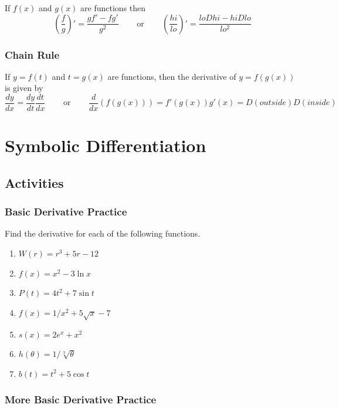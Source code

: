 \documentclass[
]{book}
\providecommand{\tightlist}{%
  \setlength{\itemsep}{0pt}\setlength{\parskip}{0pt}}
\begin{document}
If \(f(x)\) and \(g(x)\) are functions then
\[\left(\frac{f}{g} \right ) '=\frac{gf'-fg'}{g^2} \phantom{hihi}\text{ or } \phantom{hihi}\left(\frac{hi}{lo} \right ) '=\frac{loDhi-hiDlo}{lo^2}\]

\hypertarget{chain-rule}{%
\subsection{Chain Rule}\label{chain-rule}}

If \(y=f(t)\) and \(t=g(x)\) are functions, then the derivative of \(y=f(g(x))\) is given by
\[\frac{dy}{dx}=\frac{dy}{dt}\frac{dt}{dx} \phantom{hihi}\text{ or } \phantom{hihi}\frac{d}{dx}(f(g(x)))=f'(g(x))g'(x)=D(outside)D(inside)\]

\hypertarget{symbolic-differentiation}{%
\chapter{Symbolic Differentiation}\label{symbolic-differentiation}}

\hypertarget{activities-14}{%
\section{Activities}\label{activities-14}}

\hypertarget{basic-derivative-practice}{%
\subsection{Basic Derivative Practice}\label{basic-derivative-practice}}

Find the derivative for each of the following functions.

\begin{enumerate}
\def\labelenumi{\arabic{enumi}.}
\tightlist
\item
  \(W(r) = r^3 + 5r - 12\)
\item
  \(f(x) = x^2 - 3\ln x\)
\item
  \(P(t) = 4t^2 + 7\sin t\)
\item
  \(f(x) = 1/x^2 + 5\sqrt{x} - 7\)
\item
  \(s(x) = 2e^{x} + x^2\)
\item
  \(h(\theta) = 1/\sqrt[3]{\theta}\)
\item
  \(b(t) = t^2 + 5\cos t\)
\end{enumerate}

\hypertarget{more-basic-derivative-practice}{%
\subsection{More Basic Derivative Practice}\label{more-basic-derivative-practice}}
\end{document}
